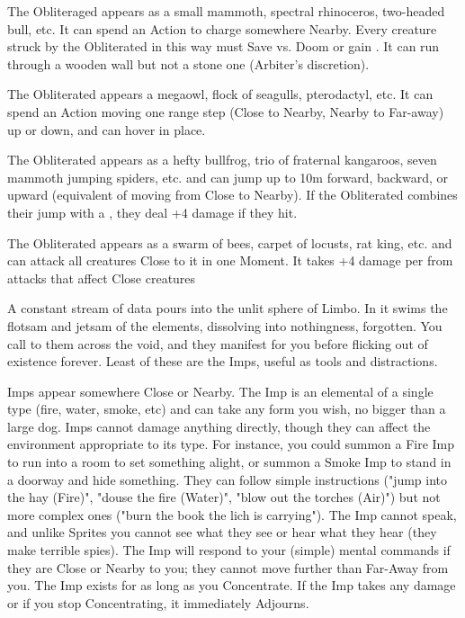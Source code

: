 \begin{multicols*}{2}
 The Obliteraged appears as a small mammoth, spectral rhinoceros, two-headed bull, etc. It can spend an Action to charge somewhere Nearby. Every creature struck by the Obliterated in this way must Save vs. Doom or gain . It can run through a wooden wall but not a stone one (Arbiter's discretion). 

 The Obliterated appears a megaowl, flock of seagulls, pterodactyl, etc. It can spend an Action moving one range step (Close to Nearby, Nearby to Far-away) up or down, and can hover in place.

 The Obliterated appears as a hefty bullfrog, trio of fraternal kangaroos, seven mammoth jumping spiders, etc. and can jump up to 10m forward, backward, or upward (equivalent of moving from Close to Nearby). If the Obliterated combines their jump with a , they deal +4 damage if they hit.

 The Obliterated appears as a swarm of bees, carpet of locusts, rat king, etc. and can attack all creatures Close to it in one Moment. It takes +4 damage per \DICE from attacks that affect  Close creatures





A constant stream of data pours into the unlit sphere of Limbo. In it swims the flotsam and jetsam of the elements, dissolving into nothingness, forgotten. You call to them across the void, and they manifest for you before flicking out of existence forever. Least of these are the Imps, useful as tools and distractions. 

  Imps appear somewhere Close or Nearby. The Imp is an elemental of a single type (fire, water, smoke, etc) and can take any form you wish, no bigger than a large dog. Imps cannot damage anything directly, though they can affect the environment appropriate to its type. For instance, you could summon a Fire Imp to run into a room to set something alight, or summon a Smoke Imp to stand in a doorway and hide something.  They can follow simple instructions ("jump into the hay (Fire)", "douse the fire (Water)", "blow out the torches (Air)") but not more complex ones ("burn the book the lich is carrying").  The Imp cannot speak, and unlike Sprites you cannot see what they see or hear what they hear (they make terrible spies). The Imp will respond to your (simple) mental commands if they are Close or Nearby to you; they cannot move further than Far-Away from you.  The Imp exists for as long as you Concentrate. If the Imp takes any damage or if you stop Concentrating, it immediately Adjourns.


\end{multicols*}
